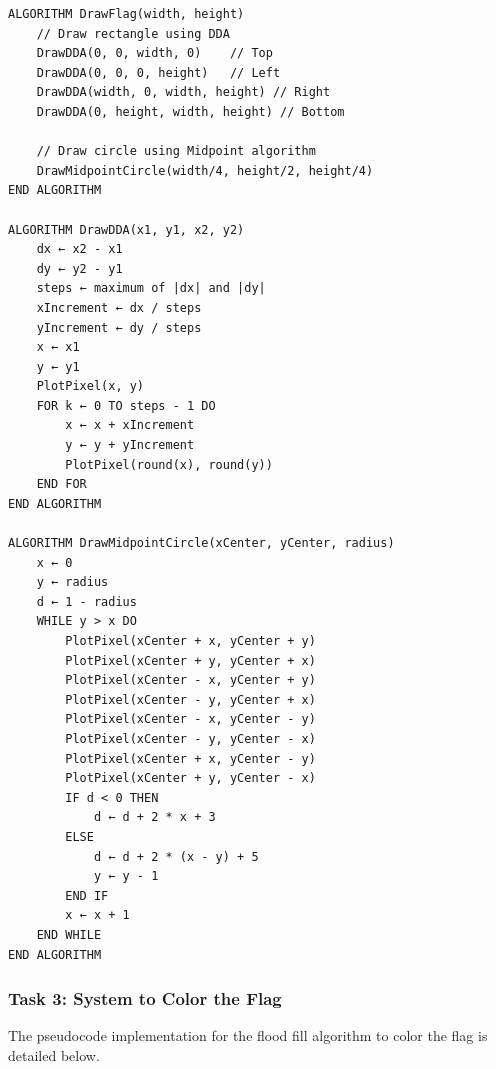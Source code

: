 \documentclass[12pt]{article}
\begin{document}
\begin{verbatim}
ALGORITHM DrawFlag(width, height)
    // Draw rectangle using DDA
    DrawDDA(0, 0, width, 0)    // Top
    DrawDDA(0, 0, 0, height)   // Left
    DrawDDA(width, 0, width, height) // Right
    DrawDDA(0, height, width, height) // Bottom
    
    // Draw circle using Midpoint algorithm
    DrawMidpointCircle(width/4, height/2, height/4)
END ALGORITHM

ALGORITHM DrawDDA(x1, y1, x2, y2)
    dx ← x2 - x1
    dy ← y2 - y1
    steps ← maximum of |dx| and |dy|
    xIncrement ← dx / steps
    yIncrement ← dy / steps
    x ← x1
    y ← y1
    PlotPixel(x, y)
    FOR k ← 0 TO steps - 1 DO
        x ← x + xIncrement
        y ← y + yIncrement
        PlotPixel(round(x), round(y))
    END FOR
END ALGORITHM

ALGORITHM DrawMidpointCircle(xCenter, yCenter, radius)
    x ← 0
    y ← radius
    d ← 1 - radius
    WHILE y > x DO
        PlotPixel(xCenter + x, yCenter + y)
        PlotPixel(xCenter + y, yCenter + x)
        PlotPixel(xCenter - x, yCenter + y)
        PlotPixel(xCenter - y, yCenter + x)
        PlotPixel(xCenter - x, yCenter - y)
        PlotPixel(xCenter - y, yCenter - x)
        PlotPixel(xCenter + x, yCenter - y)
        PlotPixel(xCenter + y, yCenter - x)
        IF d < 0 THEN
            d ← d + 2 * x + 3
        ELSE
            d ← d + 2 * (x - y) + 5
            y ← y - 1
        END IF
        x ← x + 1
    END WHILE
END ALGORITHM
\end{verbatim}

\subsubsection*{Task 3: System to Color the Flag}
The pseudocode implementation for the flood fill algorithm to color the flag is detailed below.
\end{document}
